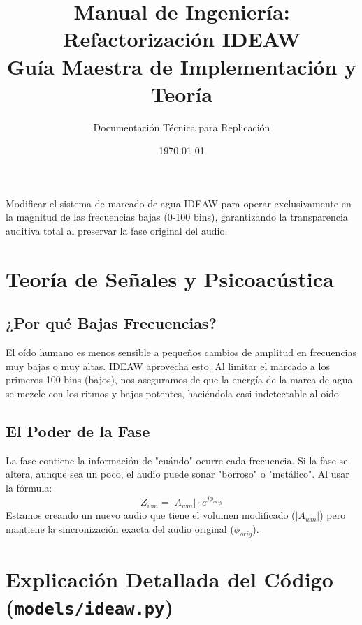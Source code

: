 \documentclass[11pt,a4paper]{article}
\title{\textbf{Manual de Ingeniería: Refactorización IDEAW}\\ \large Guía Maestra de Implementación y Teoría}
\author{Documentación Técnica para Replicación}
\date{\today}
\begin{document}
\maketitle

\begin{tcolorbox}[colback=blue!5!white,colframe=blue!75!black,title=Objetivo del Proyecto]
Modificar el sistema de marcado de agua IDEAW para operar exclusivamente en la magnitud de las frecuencias bajas (0-100 bins), garantizando la transparencia auditiva total al preservar la fase original del audio.
\end{tcolorbox}

\tableofcontents
\newpage

\section{Teoría de Señales y Psicoacústica}

\subsection{¿Por qué Bajas Frecuencias?}
El oído humano es menos sensible a pequeños cambios de amplitud en frecuencias muy bajas o muy altas. IDEAW aprovecha esto. Al limitar el marcado a los primeros 100 bins (bajos), nos aseguramos de que la energía de la marca de agua se mezcle con los ritmos y bajos potentes, haciéndola casi indetectable al oído.

\subsection{El Poder de la Fase}
La fase contiene la información de "cuándo" ocurre cada frecuencia. Si la fase se altera, aunque sea un poco, el audio puede sonar "borroso" o "metálico". 
Al usar la fórmula:
$$Z_{wm} = |A_{wm}| \cdot e^{j\phi_{orig}}$$
Estamos creando un nuevo audio que tiene el volumen modificado ($|A_{wm}|$) pero mantiene la sincronización exacta del audio original ($\phi_{orig}$).

\section{Explicación Detallada del Código (\texttt{models/ideaw.py})}
\end{document}
